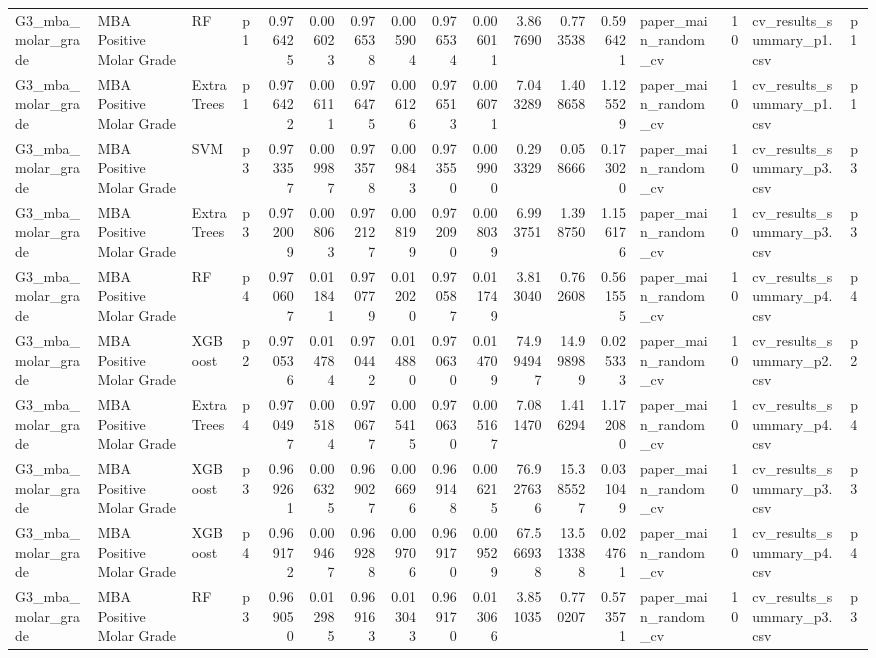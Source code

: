 \begin{tabular}{llllrrrrrrrrrlrll}
G3_mba_molar_grade & MBA Positive Molar Grade & RF & p1 & 0.976425 & 0.006023 & 0.976538 & 0.005904 & 0.976534 & 0.006011 & 3.867690 & 0.773538 & 0.596421 & paper_main_random_cv & 10 & cv_results_summary_p1.csv & p1 \\
G3_mba_molar_grade & MBA Positive Molar Grade & ExtraTrees & p1 & 0.976422 & 0.006111 & 0.976475 & 0.006126 & 0.976513 & 0.006071 & 7.043289 & 1.408658 & 1.125529 & paper_main_random_cv & 10 & cv_results_summary_p1.csv & p1 \\
G3_mba_molar_grade & MBA Positive Molar Grade & SVM & p3 & 0.973357 & 0.009987 & 0.973578 & 0.009843 & 0.973550 & 0.009900 & 0.293329 & 0.058666 & 0.173020 & paper_main_random_cv & 10 & cv_results_summary_p3.csv & p3 \\
G3_mba_molar_grade & MBA Positive Molar Grade & ExtraTrees & p3 & 0.972009 & 0.008063 & 0.972127 & 0.008199 & 0.972090 & 0.008039 & 6.993751 & 1.398750 & 1.156176 & paper_main_random_cv & 10 & cv_results_summary_p3.csv & p3 \\
G3_mba_molar_grade & MBA Positive Molar Grade & RF & p4 & 0.970607 & 0.011841 & 0.970779 & 0.012020 & 0.970587 & 0.011749 & 3.813040 & 0.762608 & 0.561555 & paper_main_random_cv & 10 & cv_results_summary_p4.csv & p4 \\
G3_mba_molar_grade & MBA Positive Molar Grade & XGBoost & p2 & 0.970536 & 0.014784 & 0.970442 & 0.014880 & 0.970630 & 0.014709 & 74.994947 & 14.998989 & 0.025333 & paper_main_random_cv & 10 & cv_results_summary_p2.csv & p2 \\
G3_mba_molar_grade & MBA Positive Molar Grade & ExtraTrees & p4 & 0.970497 & 0.005184 & 0.970677 & 0.005415 & 0.970630 & 0.005167 & 7.081470 & 1.416294 & 1.172080 & paper_main_random_cv & 10 & cv_results_summary_p4.csv & p4 \\
G3_mba_molar_grade & MBA Positive Molar Grade & XGBoost & p3 & 0.969261 & 0.006325 & 0.969027 & 0.006696 & 0.969148 & 0.006215 & 76.927636 & 15.385527 & 0.031049 & paper_main_random_cv & 10 & cv_results_summary_p3.csv & p3 \\
G3_mba_molar_grade & MBA Positive Molar Grade & XGBoost & p4 & 0.969172 & 0.009467 & 0.969288 & 0.009706 & 0.969170 & 0.009529 & 67.566938 & 13.513388 & 0.024761 & paper_main_random_cv & 10 & cv_results_summary_p4.csv & p4 \\
G3_mba_molar_grade & MBA Positive Molar Grade & RF & p3 & 0.969050 & 0.012985 & 0.969163 & 0.013043 & 0.969170 & 0.013066 & 3.851035 & 0.770207 & 0.573571 & paper_main_random_cv & 10 & cv_results_summary_p3.csv & p3 \\

\end{tabular}
